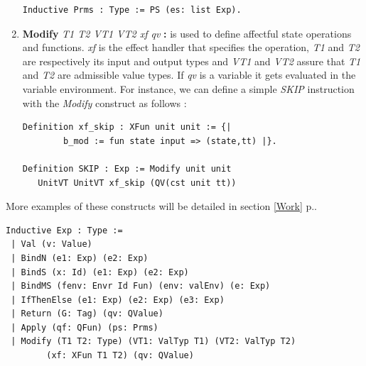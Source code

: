 \begin{enumerate}
\begin{lstlisting}[caption = {Function parameters in the deep embedding},xleftmargin=.05\textwidth,
xrightmargin=.12\textwidth]
Inductive Prms : Type := PS (es: list Exp).     
\end{lstlisting}	
\pagebreak
	\item \textbf{Modify} \textit{T1 T2 VT1 VT2 xf qv} \textbf{:} is used to define affectful state operations and functions. \textit{xf} is the effect handler that specifies the operation, \textit{T1} and \textit{T2} are respectively its input and output types and \textit{VT1} and \textit{VT2} assure that \textit{T1} and \textit{T2} are admissible value types. If \textit{qv} is a variable it gets evaluated in the variable environment. For instance, we can define a simple \textit{SKIP} instruction with the \textit{Modify} construct as follows :
\begin{lstlisting}[caption = {SKIP instruction in the deep embedding},xleftmargin=.02\textwidth,
xrightmargin=.02\textwidth]
Definition xf_skip : XFun unit unit := {|
        b_mod := fun state input => (state,tt) |}.
        
Definition SKIP : Exp := Modify unit unit 
   UnitVT UnitVT xf_skip (QV(cst unit tt))
\end{lstlisting}
\end{enumerate}
More examples of these constructs will be detailed in section \ref{Work} p.\pageref{Work}.
\begin{lstlisting}[caption = {Deep embedding expressions}, label={DeepEmb}]
Inductive Exp : Type :=
 | Val (v: Value)
 | BindN (e1: Exp) (e2: Exp) 
 | BindS (x: Id) (e1: Exp) (e2: Exp)
 | BindMS (fenv: Envr Id Fun) (env: valEnv) (e: Exp)
 | IfThenElse (e1: Exp) (e2: Exp) (e3: Exp) 
 | Return (G: Tag) (qv: QValue)
 | Apply (qf: QFun) (ps: Prms) 
 | Modify (T1 T2: Type) (VT1: ValTyp T1) (VT2: ValTyp T2)
 		(xf: XFun T1 T2) (qv: QValue)
\end{lstlisting}


